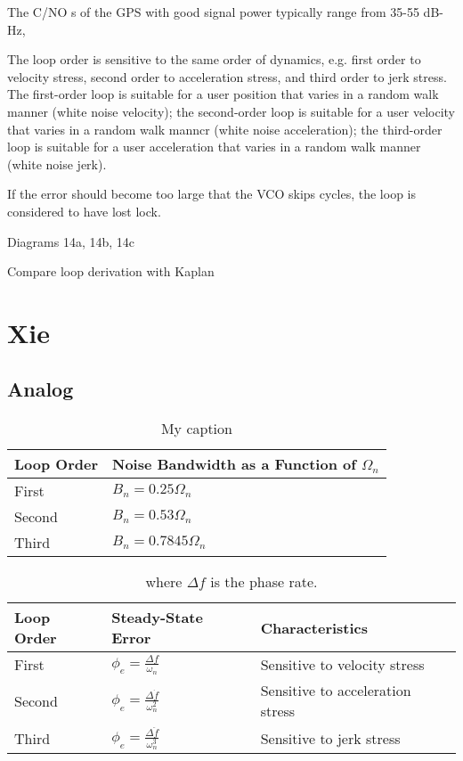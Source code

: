 The
C/NO s of the GPS with good signal power typically range
from 35-55 dB-Hz,

The loop order is sensitive to the same order of dynamics,
e.g. first order to velocity stress, second order to acceleration
stress, and third order to jerk stress. The first-order
loop is suitable for a user position that varies in a random
walk manner (white noise velocity); the second-order loop
is suitable for a user velocity that varies in a random walk
manncr (white noise acceleration); the third-order loop is
suitable for a user acceleration that varies in a random walk
manner (white noise jerk).


If the error should become too
large that the VCO skips cycles, the loop is considered to have lost lock.

Diagrams 14a, 14b, 14c 

Compare loop derivation with Kaplan






\section{Xie}

\cite{PengXie}
\subsection{Analog}

\begin{table}[!htb]
\centering
\begin{tabular}{|l|l|}
\hline
\rowcolor[HTML]{C0C0C0} 
Loop Order & Noise Bandwidth as a Function of $\Omega_n$ \\ \hline
First      & $B_n = 0.25 \Omega_n$                       \\ \hline
\rowcolor[HTML]{EFEFEF} 
Second     & $B_n = 0.53 \Omega_n$                       \\ \hline
Third      &  $B_n = 0.7845\Omega_n$                \\ \hline
\end{tabular}
\caption{My caption}
\label{tab:LoopOrderNoiseBandwith}
\end{table}

\begin{table}[!htb]
\centering
\begin{tabular}{|l|l|l|}
\hline
\rowcolor[HTML]{C0C0C0} 
Loop Order & Steady-State Error                                                 & Characteristics                  \\ \hline
First      & $\phi_e = \frac{\Delta f}{\omega_n}$                            & Sensitive to velocity stress     \\ \hline
\rowcolor[HTML]{EFEFEF} 
Second     & $\phi_e = \frac{\Delta \dot{f}}{\omega^2 _n}$  & Sensitive to acceleration stress \\ \hline
Third      & $\phi_e = \frac{\Delta \ddot{f}}{\omega^3 _n}$ & Sensitive to jerk stress         \\ \hline
\end{tabular}
\caption{where $\Delta f$ is the phase rate.}
\label{tab:NoIdea}
\end{table}


